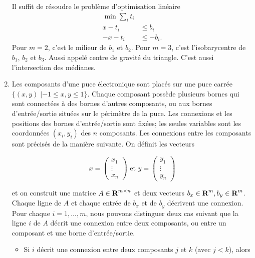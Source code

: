 \begin{enumerate}
    \begin{solution}
      Il suffit de résoudre le problème d'optimisation linéaire
      \begin{align*}
        \min \sum_i t_i\\
        x - t_i & \leq b_i\\
        -x - t_i & \leq -b_i.
      \end{align*}
      Pour $m = 2$, c'est le milieur de $b_1$ et $b_2$.
      Pour $m = 3$, c'est l'isobarycentre de $b_1$, $b_2$ et $b_3$.
      Aussi appelé centre de gravité du triangle.
      C'est aussi l'intersection des médianes.
    \end{solution}




  \item  Les composants d'une puce électronique sont placés sur
    une puce carrée $\{ (x, y) \; |  -1 \leq x, y \leq 1\}$.
    Chaque composant possède plusieurs bornes qui sont connectées à
    des bornes d'autres composants, ou aux bornes d'entrée/\-sortie situées sur le périmètre de la puce.  Les connexions et les
    positions des bornes d'entrée/sortie sont fixées; les seules variables sont les coordonnées   $(x_i, y_i)$ des $n$
    composants.  Les connexions entre les composants
    sont précisés de la manière suivante. On définit les vecteurs


    $$x=
    \left(
    \begin{array}{c}
      x_1\\
      \vdots\\
      x_n
    \end{array}
    \right)
    \mbox{ et }
    y=
    \left(
    \begin{array}{c}
      y_1\\
      \vdots\\
      y_n
    \end{array}
    \right)
    $$



    et on construit une matrice $A \in {\mbox{\bf R}}^{m \times n}$ et deux vecteurs $b_x \in {\mbox{\bf R}}^m, b_y \in {\mbox{\bf R}}^m$.
    Chaque ligne de
    $A$ et chaque entrée de $b_x$ et de $b_y$ décrivent une connexion. Pour chaque $i=1, \ldots, m$, nous pouvons distinguer deux cas
    suivant que la ligne $i$ de $A$ décrit une connexion entre deux composants, ou entre un composant et une borne d'entrée/sortie.
    \begin{itemize}
      \item Si $i$ décrit une connexion entre deux composants $j$ et $k$ (avec $j < k$), alors


\end{itemize}
\end{enumerate}
